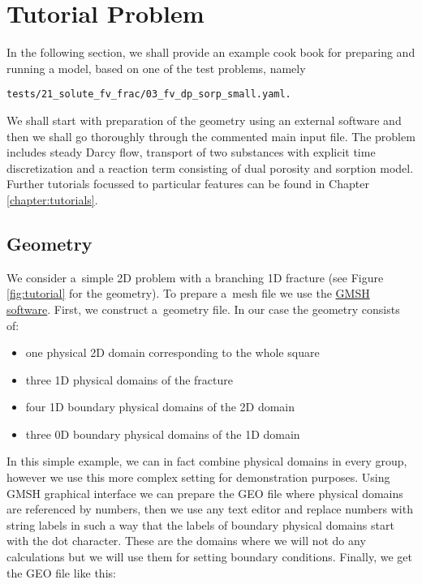 

\section{Tutorial Problem}
In the following section, we shall provide an example cook book for preparing and running a model,
based on one of the test problems, namely
\begin{verbatim}
tests/21_solute_fv_frac/03_fv_dp_sorp_small.yaml.
\end{verbatim}
We shall start with preparation of the geometry using an external software and then we shall go thoroughly through the 
commented main input file. The problem includes steady Darcy flow, transport of two substances with explicit
time discretization and a reaction term consisting of dual porosity and sorption model.
Further tutorials focussed to particular features can be found in Chapter \ref{chapter:tutorials}.

\subsection{Geometry}
We consider a~simple 2D problem with a branching 1D fracture (see Figure \ref{fig:tutorial} for the geometry). 
To prepare a~mesh file we use the \href{http://geuz.org/gmsh/}{GMSH software}.
First, we construct a~geometry file. In our case the geometry consists of: 
\begin{itemize}
 \item one physical 2D domain corresponding to the whole square
 \item three 1D physical domains of the fracture
 \item four 1D boundary physical domains of the 2D domain
 \item three 0D boundary physical domains of the 1D domain
\end{itemize}
In this simple example, we can in fact combine physical domains in every group, however we use this more complex setting for
demonstration purposes. Using GMSH graphical interface we can prepare the GEO file where physical domains are referenced by numbers, then we use 
any text editor and replace numbers with string labels in such a way that the labels of boundary physical domains start with the dot character. 
These are the domains where we will not do any calculations but we will use them for setting boundary conditions.
Finally, we get the GEO file like this:

